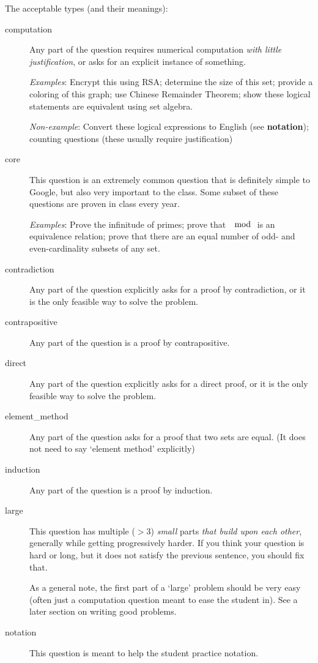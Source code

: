    The acceptable types (and their meanings):
    \begin{description}
      \item[computation] Any part of the question requires numerical computation \textit{with little justification}, or asks for an explicit instance of something.
      
      \textit{Examples}: Encrypt this using RSA; determine the size of this set; provide a coloring of this graph; use Chinese Remainder Theorem; show these logical statements are equivalent using set algebra.
      
      \textit{Non-example}: Convert these logical expressions to English (see \textbf{notation}); counting questions (these usually require justification)
      \item[core] This question is an extremely common question that is definitely simple to Google, but also very important to the class. Some subset of these questions are proven in class every year.
      
      \textit{Examples}: Prove the infinitude of primes; prove that $\mod$ is an equivalence relation; prove that there are an equal number of odd- and even-cardinality subsets of any set.
      \item[contradiction] Any part of the question explicitly asks for a proof by contradiction, or it is the only feasible way to solve the problem.
      \item[contrapositive] Any part of the question is a proof by contrapositive.
      \item[direct] Any part of the question explicitly asks for a direct proof, or it is the only feasible way to solve the problem.
      \item[element\_method] Any part of the question asks for a proof that two sets are equal. (It does not need to say `element method' explicitly)
      \item[induction] Any part of the question is a proof by induction.
      \item[large] This question has multiple ($>3$) \textit{small} parts \textit{that build upon each other}, generally while getting progressively harder. If you think your question is hard or long, but it does not satisfy the previous sentence, you should fix that.
      
      As a general note, the first part of a `large' problem should be very easy (often just a computation question meant to ease the student in). See a later section on writing good problems.
      \item[notation] This question is meant to help the student practice notation.
      

\end{description}
